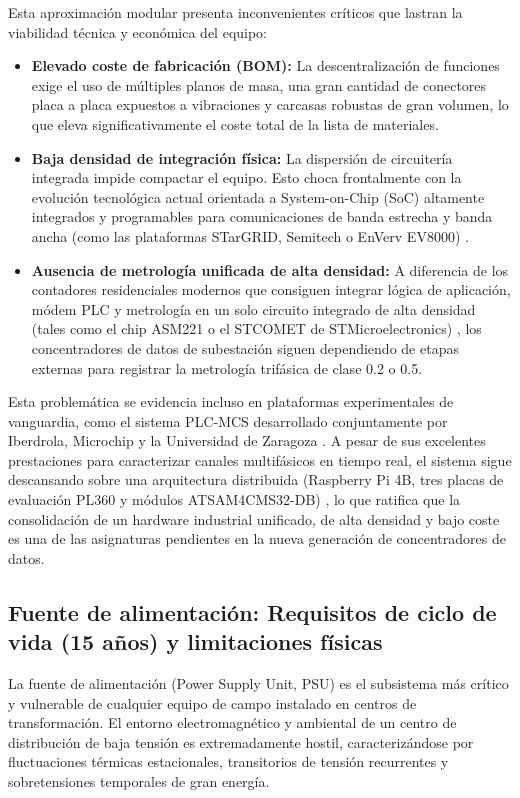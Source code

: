 Esta aproximación modular presenta inconvenientes críticos que lastran la viabilidad técnica y económica del equipo:
\begin{itemize}
    \item \textbf{Elevado coste de fabricación (BOM):} La descentralización de funciones exige el uso de múltiples planos de masa, una gran cantidad de conectores placa a placa expuestos a vibraciones y carcasas robustas de gran volumen, lo que eleva significativamente el coste total de la lista de materiales.
    \item \textbf{Baja densidad de integración física:} La dispersión de circuitería integrada impide compactar el equipo. Esto choca frontalmente con la evolución tecnológica actual orientada a System-on-Chip (SoC) altamente integrados y programables para comunicaciones de banda estrecha y banda ancha (como las plataformas STarGRID, Semitech o EnVerv EV8000) \cite{SHARMA2017704}.
    \item \textbf{Ausencia de metrología unificada de alta densidad:} A diferencia de los contadores residenciales modernos que consiguen integrar lógica de aplicación, módem PLC y metrología en un solo circuito integrado de alta densidad (tales como el chip ASM221 o el STCOMET de STMicroelectronics) \cite{SHARMA2017704}, los concentradores de datos de subestación siguen dependiendo de etapas externas para registrar la metrología trifásica de clase 0.2 o 0.5.
\end{itemize}

Esta problemática se evidencia incluso en plataformas experimentales de vanguardia, como el sistema PLC-MCS desarrollado conjuntamente por Iberdrola, Microchip y la Universidad de Zaragoza \cite{10488780}. A pesar de sus excelentes prestaciones para caracterizar canales multifásicos en tiempo real, el sistema sigue descansando sobre una arquitectura distribuida (Raspberry Pi 4B, tres placas de evaluación PL360 y módulos ATSAM4CMS32-DB) \cite{10488780}, lo que ratifica que la consolidación de un hardware industrial unificado, de alta densidad y bajo coste es una de las asignaturas pendientes en la nueva generación de concentradores de datos.

\subsection{Fuente de alimentación: Requisitos de ciclo de vida (15 años) y limitaciones físicas}
\label{subsec:fuente_alimentacion_15anos}

La fuente de alimentación (Power Supply Unit, PSU) es el subsistema más crítico y vulnerable de cualquier equipo de campo instalado en centros de transformación. El entorno electromagnético y ambiental de un centro de distribución de baja tensión es extremadamente hostil, caracterizándose por fluctuaciones térmicas estacionales, transitorios de tensión recurrentes y sobretensiones temporales de gran energía.

